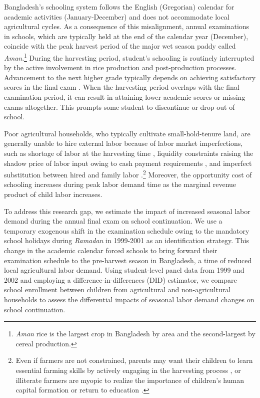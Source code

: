 \documentclass[12pt,letterpaper]{article}
\newcommand{\0}{\ensuremath{\mbox{\boldmath $0$}}}
\begin{document}
Bangladesh's schooling system follows the English (Gregorian) calendar for academic activities (January-December) and does not accommodate local agricultural cycles. As a consequence of this misalignment, annual examinations in schools, which are typically held at the end of the calendar year (December), coincide with the peak harvest period of the major wet season paddy called \textit{Aman}.\footnote{\textit{Aman} rice is the largest crop in Bangladesh by area and the second-largest by cereal production.} During the harvesting period, student's schooling is routinely interrupted by the active involvement in rice production and post-production processes. Advancement to the next higher grade typically depends on achieving satisfactory scores in the final exam \citep{ADB2017}. When the harvesting period overlaps with the final examination period, it can result in attaining lower academic scores or missing exams altogether. This prompts some student to discontinue or drop out of school. 

Poor agricultural households, who typically cultivate small-hold-tenure land, are generally unable to hire external labor because of labor market imperfections, such as shortage of labor at the harvesting time \citep{rosenzweig1988labor}, liquidity constraints raising the shadow price of labor input owing to cash payment requirements \citep{singh1986agricultural}, and imperfect substitution between hired and family labor \citep{de1991peasant}.\footnote{Even if farmers are not constrained, parents may want their children to learn essential farming skills by actively engaging in the harvesting process \citep{bhalotra2003child}, or illiterate farmers are myopic to realize the importance of children's human capital formation or return to education \citep{BalandRobinson2000}. } Moreover, the opportunity cost of schooling increases during peak labor demand time as the marginal revenue product of child labor increases.

To address this research gap, we estimate the impact of increased seasonal labor demand during the annual final exam on school continuation. We use a temporary exogenous shift in the examination schedule owing to the mandatory school holidays during \textit{Ramadan} in 1999-2001 as an identification strategy. This change in the academic calendar forced schools to bring forward their examination schedule to the pre-harvest season in Bangladesh, a time of reduced local agricultural labor demand. Using student-level panel data from 1999 and 2002 and employing a difference-in-differences (DID) estimator, we compare school enrollment between children from agricultural and non-agricultural households to assess the differential impacts of seasonal labor demand changes on school continuation. 
\end{document}
